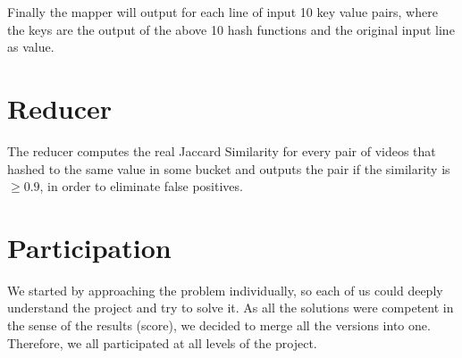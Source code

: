 \documentclass[a4paper, 11pt]{article}
\begin{document}
Finally the mapper will output for each line of input 10 key value pairs, where
the keys are the output of the above 10 hash functions and the original input line
as value.

\section{Reducer}

The reducer computes the real Jaccard Similarity for every pair of videos that
hashed to the same value in some bucket and outputs the pair if the similarity
is $\ge 0.9$, in order to eliminate false positives. 

\section{Participation}

We started by approaching the problem individually, so each of us could deeply understand the project and try to solve it. As all the solutions were competent in the sense of the results (score), we decided to merge all the versions into one. Therefore, we all participated at all levels of the project.
\end{document}
